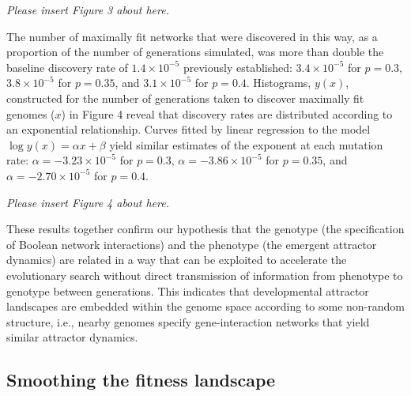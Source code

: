 \documentclass[10pt,letterpaper]{article}
\begin{document}
\vspace{1em}\emph{\noindent Please insert Figure 3 about here.}\vspace{1em}

The number of maximally fit networks that were discovered in this way, as a proportion of the number of generations simulated, was more than double the baseline discovery rate of $1.4\times 10^{-5}$ previously established: $3.4\times 10^{-5}$ for $p=0.3$, $3.8\times 10^{-5}$ for $p=0.35$, and $3.1\times 10^{-5}$ for $p=0.4$. %
Histograms, $y(x)$, constructed for the number of generations taken to discover maximally fit genomes ($x$) in Figure 4 reveal that discovery rates are distributed according to an exponential relationship. Curves fitted by linear regression to the model $\log y(x)=\alpha x+\beta$ yield similar estimates of the exponent at each mutation rate: $\alpha=-3.23\times 10^{-5}$ for $p=0.3$,  $\alpha=-3.86\times 10^{-5}$ for $p=0.35$, and $\alpha=-2.70\times 10^{-5}$ for $p=0.4$. %

\vspace{1em}\emph{\noindent Please insert Figure 4 about here.}\vspace{1em}

These results together confirm our hypothesis that the genotype (the specification of Boolean network interactions) and the phenotype (the emergent attractor dynamics) are related in a way that can be exploited to accelerate the evolutionary search  without direct transmission of information from phenotype to genotype between generations. This indicates that developmental attractor landscapes are embedded within the genome space according to some non-random structure, i.e., nearby genomes specify gene-interaction networks that yield similar attractor dynamics. 

\subsection*{Smoothing the fitness landscape}
\end{document}
